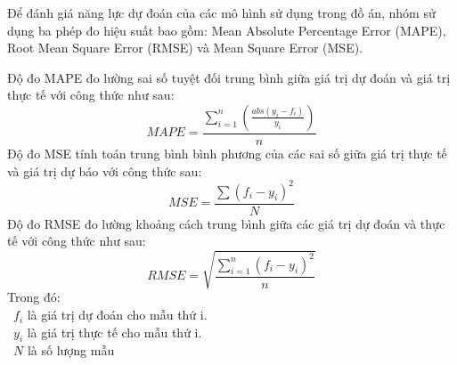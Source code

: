Để đánh giá năng lực dự đoán của các mô hình sử dụng trong đồ án, nhóm sử dụng ba phép đo hiệu suất bao gồm: Mean Absolute Percentage Error (MAPE), Root Mean Square Error (RMSE) và Mean Square Error (MSE).

Độ đo MAPE đo lường sai số tuyệt đối trung bình giữa giá trị dự đoán và giá trị thực tế với công thức như sau:
\[
MAPE = \frac{\sum_{i=1}^{n}\left(\frac{abs(y_i - f_i)}{y_i}\right)}{n}
\]
Độ đo MSE tính toán trung bình bình phương của các sai số giữa giá trị thực tế và giá trị dự báo với công thức sau:
\[
MSE = \frac{\sum(f_i - y_i)^2}{N}
\]
Độ đo RMSE đo lường khoảng cách trung bình giữa các giá trị dự đoán và thực tế với công thức như sau:
\[
RMSE = \sqrt{\frac{\sum_{i=1}^{n}(f_i - y_i)^2}{n}}
\]
Trong đó:\\
    \indent\textbullet\ \(f_{i}\) là giá trị dự đoán cho mẫu thứ i.\\
    \indent\textbullet\ \(y_{i}\) là giá trị thực tế cho mẫu thứ i.\\
    \indent\textbullet\ \(N\) là số lượng mẫu\\
